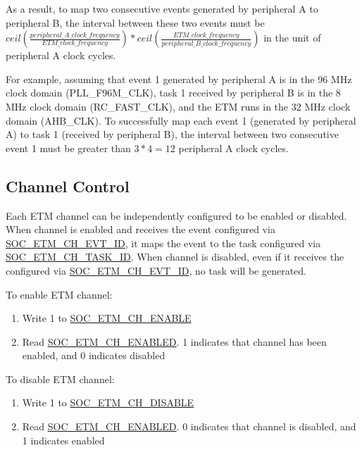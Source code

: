\documentclass[main\_\_EN.tex]{subfiles}
\begin{document}
As a result, to map two consecutive events generated by peripheral A to peripheral B, the interval between these two events must be $ceil(\frac{peripheral\_A\_clock\_frequency}{ETM\_clock\_frequency})*ceil(\frac{ETM\_clock\_frequency}{peripheral\_B\_clock\_frequency})$ in the unit of peripheral A clock cycles.

For example, assuming that event 1 generated by peripheral A is in the 96 MHz clock domain (PLL\_F96M\_CLK), task 1 received by peripheral B is in the 8 MHz clock domain (RC\_FAST\_CLK), and the ETM runs in the 32 MHz clock domain (AHB\_CLK). To successfully map each event 1 (generated by peripheral A) to task 1 (received by peripheral B), the interval between two consecutive event 1 must be greater than $3*4=12$ peripheral A clock cycles.



\subsection{Channel Control}
\label{sec:evntaskmatrix-channel-enable}
Each ETM channel can be independently configured to be enabled or disabled. When channel is enabled and receives the event configured via \hyperref[fielddesc:SOCETMCH0EVTID]{SOC\_ETM\_CH\_EVT\_ID}, it maps the event to the task configured via \hyperref[fielddesc:SOCETMCH0TASKID]{SOC\_ETM\_CH\_TASK\_ID}. When channel is disabled, even if it receives the configured via \hyperref[fielddesc:SOCETMCH0EVTID]{SOC\_ETM\_CH\_EVT\_ID}, no task will be generated.

To enable ETM channel:
\begin{enumerate}
    \item Write 1 to \hyperref[fielddesc:SOCETMCHENABLE0]{SOC\_ETM\_CH\_ENABLE}
    \item Read \hyperref[fielddesc:SOCETMCHENABLED0]{SOC\_ETM\_CH\_ENABLED}. 1 indicates that channel has been enabled, and 0 indicates disabled
\end{enumerate}


To disable ETM channel:
\begin{enumerate}
    \item Write 1 to \hyperref[fielddesc:SOCETMCHDISABLE0]{SOC\_ETM\_CH\_DISABLE}
    \item Read \hyperref[fielddesc:SOCETMCHENABLED0]{SOC\_ETM\_CH\_ENABLED}. 0 indicates that channel is disabled, and 1 indicates enabled
\end{enumerate}
\end{document}
